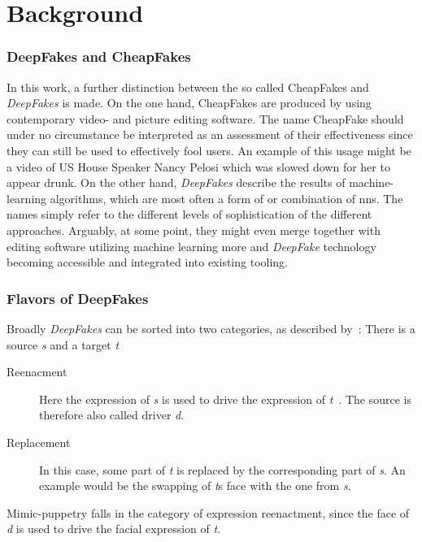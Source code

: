 \section{Background}\label{sect:background}

\subsubsection{DeepFakes and CheapFakes}
In this work, a further distinction between the so called CheapFakes and \textit{DeepFakes}
is made. On the one hand, CheapFakes are produced by using contemporary video- 
and picture editing software. The name CheapFake should under no circumstance be
interpreted as an assessment of their effectiveness since they can still be used
to effectively fool users. An example of this usage might be a video of US House
Speaker Nancy Pelosi which was slowed down for her to appear drunk.
On the other hand, \textit{DeepFakes} describe the results of machine-learning
algorithms, which are most often a form of or combination of \glspl{nn}.
The names simply refer to the different levels of sophistication of the different
approaches. Arguably, at some point, they might even merge together with editing 
software utilizing machine learning more and \textit{DeepFake} technology becoming
accessible and integrated into existing tooling.

\subsubsection{Flavors of DeepFakes}\label{subsubsect:deepfake-flavors}
Broadly \textit{DeepFakes} can be sorted into two categories, as described by~\textcite{mirsky_creation_2020}:
There is a source \textit{s} and a target \textit{t}

\begin{description}
    \item[Reenacment] Here the expression of \textit{s} is used to drive
    the expression of \textit{t}~\cite{mirsky_creation_2020}. The source is
    therefore also called driver \textit{d}.
    \item[Replacement] In this case, some part of \textit{t} is replaced
    by the corresponding part of \textit{s}. An example would be the swapping of
    \textit{t}s face with the one from \textit{s}.
\end{description}

Mimic-puppetry falls in the category of expression reenactment, since the face of
\textit{d} is used to drive the facial expression of \textit{t}.


